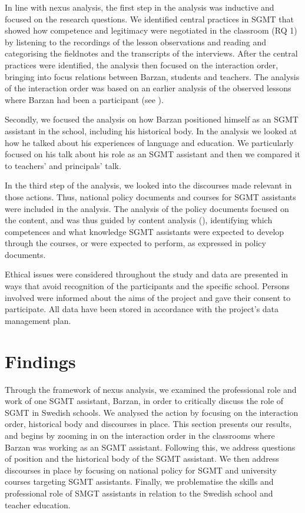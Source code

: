 \documentclass[output=paper]{langscibook}
\begin{document}
In line with nexus analysis, the first step in the analysis was inductive and focused on the research questions. We identified central practices in SGMT that showed how competence and legitimacy were negotiated in the classroom (RQ 1) by listening to the recordings of the lesson observations and reading and categorising the fieldnotes and the transcripts of the interviews. After the central practices were identified, the analysis then focused on the interaction order, bringing into focus relations between Barzan, students and teachers. The analysis of the interaction order was based on an earlier analysis of the observed lessons where Barzan had been a participant (see \citealt{WedinAho2022}).

Secondly, we focused the analysis on how Barzan positioned himself as an SGMT assistant in the school, including his historical body. In the analysis we looked at how he talked about his experiences of language and education. We particularly focused on his talk about his role as an SGMT assistant and then we compared it to teachers’ and principals’ talk. 

In the third step of the analysis, we looked into the discourses made relevant in those actions. Thus, national policy documents and courses for SGMT assistants were included in the analysis. The analysis of the policy documents focused on the content, and was thus guided by content analysis (\citealt{Swedish_ministry_of_education1992,Swedish_ministry_of_education1993}), identifying which competences and what knowledge SGMT assistants were expected to develop through the courses, or were expected to perform, as expressed in policy documents.   

Ethical issues were considered throughout the study and data are presented in ways that avoid recognition of the participants and the specific school. Persons involved were informed about the aims of the project and gave their consent to participate. All data have been stored in accordance with the project’s data management plan.

\section{Findings}

Through the framework of nexus analysis, we examined the professional role and work of one SGMT assistant, Barzan, in order to critically discuss the role of SGMT in Swedish schools. We analysed the action by focusing on the interaction order, historical body and discourses in place.  This section presents our results, and begins by zooming in on the interaction order in the classrooms where Barzan was working as an SGMT assistant. Following this, we address questions of position and the historical body of the SGMT assistant. We then address discourses in place by focusing on national policy for SGMT and university courses targeting SGMT assistants. Finally, we problematise the skills and professional role of SMGT assistants in relation to the Swedish school and teacher education. 
\end{document}
